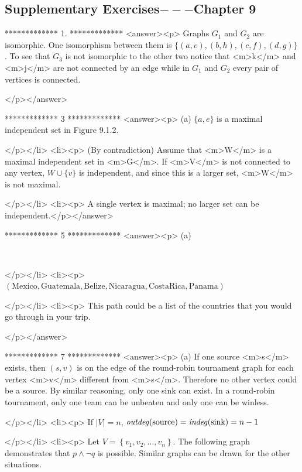 \subsection{Supplementary Exercises$---$Chapter 9}

*************
1.
*************
<answer><p> Graphs \(G_1\) and \(G_2\) are isomorphic. One isomorphism between them is \(\{(a,e), (b,h), (c,f), (d,g)\}\). To see that \(G_3\) is not isomorphic
to the other two notice that <m>k</m> and <m>j</m> are not connected by an edge while in \(G_1\) and \(G_2\) every pair of vertices is connected.

</p></answer>


*************
3
*************
<answer><p> (a) \(\{a,e\}\) is a maximal independent set in Figure 9.1.2.

</p></li>
<li><p> (By contradiction) Assume that <m>W</m> is a maximal independent set in <m>G</m>. If <m>V</m> is not connected to any vertex, \(W\cup
\{v\}\) is independent, and since this is a larger set, <m>W</m> is not maximal.

</p></li>
<li><p> A single vertex is maximal; no larger set can be independent.</p></answer>


*************
5
*************
<answer><p> (a)

\begin{doublespace}
\noindent\(\)
\end{doublespace}

</p></li>
<li><p> \((\text{Mexico},\text{Guatemala},\text{Belize},\text{Nicaragua},\text{Costa} \text{Rica},\text{Panama})\)

</p></li>
<li><p> This path could be a list of the countries that you would go through in your trip.

</p></answer>


*************
7
*************
<answer><p> (a) If one source <m>s</m> exists, then \((s,v)\) is on the edge of the round-robin tournament graph for each vertex <m>v</m> different
from <m>s</m>. Therefore no other vertex could be a source. By similar reasoning, only one sink can exist. In a round-robin tournament, only one
team can be unbeaten and only one can be winless.

</p></li>
<li><p> If \(\left| V\right| =n\), \(\text{\textit{outdeg}}(\text{source}) =\text{\textit{$ $}}\text{\textit{indeg}}\text{\textit{$($}}\text{sink}) =
n-1\)

</p></li>
<li><p> Let \(V=\left\{v_1,v_2,\ldots ,v_n\right\}\). The following graph demonstrates that \(p\land \neg q\) is possible. Similar graphs can be drawn
for the other situations.

